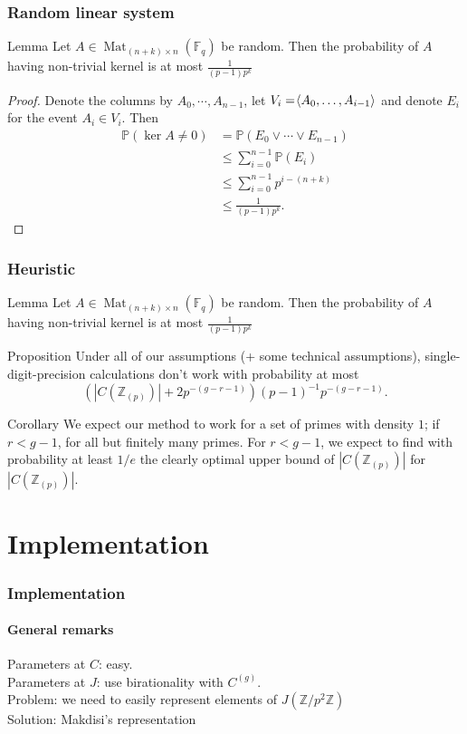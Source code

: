 \documentclass[15pt]{beamer}
\newcommand{\Z}{\mathbb{Z}}
\renewcommand{\P}{\mathbb{P}}
\newcommand{\F}{\mathbb{F}}
\renewcommand{\angle}[1]{\hspace{-2pt}\left\langle #1 \right\rangle}
\DeclareMathOperator{\Mat}{Mat}
\begin{document}
\begin{frame}
    \frametitle{Random linear system}
    \begin{block}{Lemma}
    Let $A \in \Mat_{(n+k)\times n}(\F_q)$ be random. Then the probability of $A$ having non-trivial kernel is at most $\frac{1}{(p-1)p^k}$
    \end{block}\pause
    \begin{proof}
    Denote the columns by $A_0,\cdots,A_{n-1}$, let $V_i = \angle{A_0,\dots,A_{i-1}}$ and denote $E_i$ for the event $A_i \in V_i$. Then 
    \begin{align*}
    \P(\ker A \not= 0) &= \P(E_0 \vee \cdots \vee E_{n-1}) \\
                       &\leq \sum_{i=0}^{n-1} \P(E_i) \\
                       &\leq \sum_{i=0}^{n-1} p^{i-(n+k)} \\
                       &\leq \frac{1}{(p-1)p^k}.
    \end{align*}
    \end{proof}
\end{frame}

\begin{frame}
    \frametitle{Heuristic}
    \begin{block}{Lemma}
    Let $A \in \Mat_{(n+k)\times n}(\F_q)$ be random. Then the probability of $A$ having non-trivial kernel is at most $\frac{1}{(p-1)p^k}$
    \end{block}
    \begin{block}{Proposition}
    Under all of our assumptions (+ some technical assumptions), single-digit-precision calculations don't work with probability at most\[
    (|C(\Z_{(p)})|+2p^{-(g-r-1)})(p-1)^{-1}p^{-(g-r-1)}.
    \]
    \end{block}\pause
    \begin{block}{Corollary}
    We expect our method to work for a set of primes with density $1$; if $r < g-1$, for all but finitely many primes.
    For $r < g-1$, we expect to find with probability at least $1/e$ the clearly optimal upper bound of $|C(\Z_{(p)})|$ for $|C(\Z_{(p)})|$.
    \end{block}
\end{frame}

\section{Implementation}
\begin{frame}
    \frametitle{Implementation}
    \framesubtitle{General remarks}
    Parameters at $C$: easy.\\ \pause
    Parameters at $J$: use birationality with $C^{(g)}$.\\ \pause
    Problem: we need to easily represent elements of $J(\Z/p^2\Z)$\\\pause
    Solution: Makdisi's representation
\end{frame}
\end{document}
